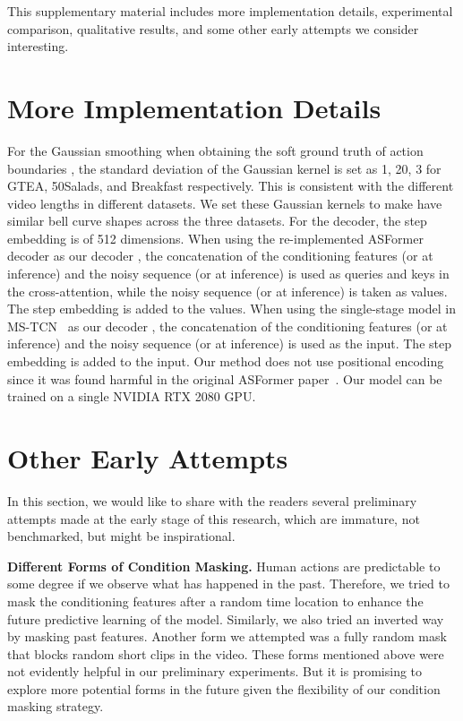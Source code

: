 \documentclass[10pt,twocolumn,letterpaper]{article}
\begin{document}
This supplementary material includes more implementation details, experimental comparison, qualitative results, and some other early attempts we consider interesting. 

\section{More Implementation Details}

For the Gaussian smoothing when obtaining the soft ground truth of action boundaries , the standard deviation of the Gaussian kernel is set as 1, 20, 3 for GTEA, 50Salads, and Breakfast respectively.
This is consistent with the different video lengths in different datasets.
We set these Gaussian kernels to make  have similar bell curve shapes across the three datasets.
For the decoder, the step embedding is of 512 dimensions.
When using the re-implemented ASFormer~\cite{2021_BMVC_Yi} decoder as our decoder , the concatenation of the conditioning features  (or  at inference) and the noisy sequence  (or  at inference) is used as queries and keys in the cross-attention, while the noisy sequence  (or  at inference) is taken as values.
The step embedding is added to the values. 
When using the single-stage model in MS-TCN~\cite{2019_CVPR_Farha} as our decoder , the concatenation of the conditioning features  (or  at inference) and the noisy sequence  (or  at inference) is used as the input.
The step embedding is added to the input. 
Our method does not use positional encoding since it was found harmful in the original ASFormer paper~\cite{2021_BMVC_Yi}.
Our model can be trained on a single NVIDIA RTX 2080 GPU.

\section{Other Early Attempts}

In this section, we would like to share with the readers several preliminary attempts made at the early stage of this research, which are immature, not benchmarked, but might be inspirational.

\textbf{Different Forms of Condition Masking.}
Human actions are predictable to some degree if we observe what has happened in the past.
Therefore, we tried to mask the conditioning features after a random time location to enhance the future predictive learning of the model.
Similarly, we also tried an inverted way by masking past features.
Another form we attempted was a fully random mask that blocks random short clips in the video.
These forms mentioned above were not evidently helpful in our preliminary experiments.
But it is promising to explore more potential forms in the future given the flexibility of our condition masking strategy.
\end{document}
